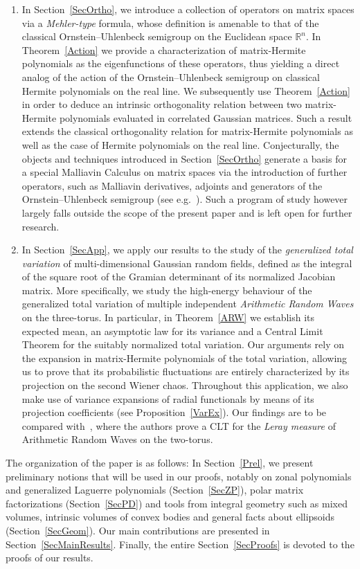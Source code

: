 \documentclass[10pt]{amsart}
\theoremstyle{definition}\newtheorem{defi}[theo]{Definition}\newtheorem{rema}[theo]{Remark}\newtheorem{exam}[theo]{Example}\newtheorem{exem}[theo]{Example}\newtheorem{nota}[theo]{Notation}
\newcommand{\R}{\mathbb{R}}
\begin{document}
\begin{enumerate}
\item In Section~\ref{SecOrtho}, we introduce a collection of operators on matrix spaces via a \emph{Mehler-type} formula, whose definition is amenable to that of the classical Ornstein--Uhlenbeck semigroup on the Euclidean space $\R^n$. In Theorem~\ref{Action} we provide a characterization of matrix-Hermite polynomials as the eigenfunctions of these operators, thus yielding a direct analog of the action of the Ornstein--Uhlenbeck semigroup on classical Hermite polynomials on the real line. We subsequently use Theorem~\ref{Action} in order to deduce an intrinsic orthogonality relation between two matrix-Hermite polynomials evaluated in correlated Gaussian matrices. Such a result extends the classical orthogonality relation for matrix-Hermite polynomials as well as the case of Hermite polynomials on the real line. Conjecturally, the objects and techniques introduced in Section~\ref{SecOrtho} generate a basis for a special Malliavin Calculus on matrix spaces via the introduction of further operators, such as Malliavin derivatives, adjoints and generators of the Ornstein--Uhlenbeck semigroup (see e.g.~\cite{NP12,N06}). Such a program of study however largely falls outside the scope of the present paper and is left open for further research.
\item In Section~\ref{SecApp}, we apply our results to the study of the \emph{generalized total variation} of multi-dimensional Gaussian random fields, defined as the integral of the square root of the Gramian determinant of its normalized Jacobian matrix. More specifically, we study the high-energy behaviour of the generalized total variation of multiple independent \emph{Arithmetic Random Waves} on the three-torus. In particular, in Theorem~\ref{ARW} we establish its expected mean, an asymptotic law for its variance and a Central Limit Theorem for the suitably normalized total variation. Our arguments rely on the expansion in matrix-Hermite polynomials of the total variation, allowing us to prove that its probabilistic fluctuations are entirely characterized by its projection on the second Wiener chaos. Throughout this application, we also make use of variance expansions of radial functionals by means of its projection coefficients (see Proposition~\ref{VarEx}). Our findings are to be compared with~\cite[Theorem~1]{PR16}, where the authors prove a CLT for the \emph{Leray measure} of Arithmetic Random Waves on the two-torus.
\end{enumerate}


The organization of the paper is as follows: In Section~\ref{Prel}, we present preliminary notions that will be used in our proofs, notably on zonal polynomials and generalized Laguerre polynomials (Section~\ref{SecZP}), polar matrix factorizations (Section~\ref{SecPD}) and tools from integral geometry such as mixed volumes, intrinsic volumes of convex bodies and general facts about ellipsoids (Section~\ref{SecGeom}). Our main contributions are presented in Section~\ref{SecMainResults}. Finally, the entire Section~\ref{SecProofs} is devoted to the proofs of our results.
\end{document}
